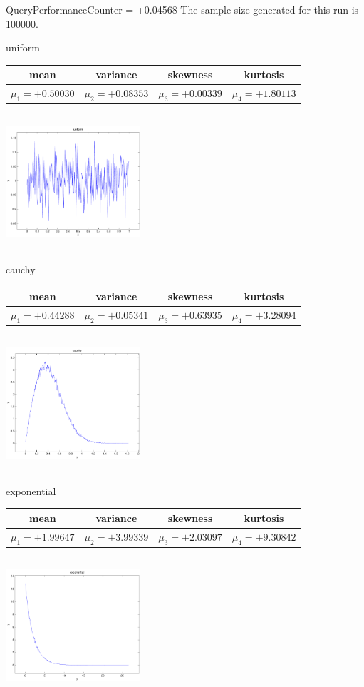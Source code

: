 \documentclass[9pt]{article}
\theoremstyle{plain}
\theoremstyle{definition}
\theoremstyle{remark}
\numberwithin{equation}{section}
\begin{document}
QueryPerformanceCounter  =  +0.04568
The sample size generated for this run is 100000.

\newpage
uniform \begin{tabular}{|c|c|c|c|}  mean & variance & skewness & kurtosis \\  \hline
$\mu_1 = +0.50030$ & $\mu_2 = +0.08353$ & $\mu_3 = +0.00339$ & $\mu_4 =+1.80113$ \\
\end{tabular}

\includegraphics[width=5cm,height=5cm]{uniform.pdf}

cauchy \begin{tabular}{|c|c|c|c|}  mean & variance & skewness & kurtosis \\  \hline
$\mu_1 = +0.44288$ & $\mu_2 = +0.05341$ & $\mu_3 = +0.63935$ & $\mu_4 =+3.28094$ \\
\end{tabular}

\includegraphics[width=5cm,height=5cm]{cauchy.pdf}

exponential \begin{tabular}{|c|c|c|c|}  mean & variance & skewness & kurtosis \\  \hline
$\mu_1 = +1.99647$ & $\mu_2 = +3.99339$ & $\mu_3 = +2.03097$ & $\mu_4 =+9.30842$ \\
\end{tabular}

\includegraphics[width=5cm,height=5cm]{exponential.pdf}
\end{document}
